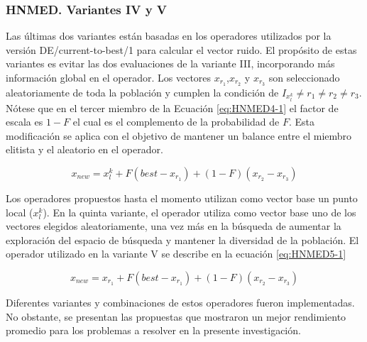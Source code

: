 \subsubsection{HNMED. Variantes IV y V }
Las últimas dos variantes están basadas en los operadores utilizados por la versión DE/current-to-best/1 para calcular el vector ruido. El propósito de estas variantes es evitar las dos evaluaciones de la variante III, incorporando más información global en el operador. Los vectores $x_{r_1}$,$x_{r_2}$ y $x_{r_3}$ son seleccionado aleatoriamente de toda la población y cumplen la condición de $ I_{x^k_l} \neq r_1 \neq r_2 \neq r_3$. Nótese que en el tercer miembro de la Ecuación \ref{eq:HNMED4-1} el factor de escala es $1-F$ el cual es el complemento de la probabilidad de $F$. Esta modificación se aplica con el objetivo de mantener un balance entre el miembro elitista y el aleatorio en el operador.
\begin{center}
\begin{equation}\label{eq:HNMED4-1}
x_{new}= x^k_l+F(best-x_{r_1})+(1-F)(x_{r_2}-x_{r_3})
\end{equation}
\end{center}
Los operadores propuestos hasta el momento utilizan como vector base un punto local ($x^k_l$). En la quinta variante, el operador utiliza como vector base uno de los vectores elegidos aleatoriamente, una vez más en la búsqueda de aumentar la exploración del espacio de búsqueda y mantener la diversidad de la población. El operador utilizado en la variante V se describe en la ecuación \ref{eq:HNMED5-1}
\begin{center}
\begin{equation}\label{eq:HNMED5-1}
x_{new}= x_{r_1}+F(best-x_{r_1})+(1-F)(x_{r_2}-x_{r_3})
\end{equation}
\end{center}
Diferentes variantes y combinaciones de estos operadores fueron implementadas. No obstante, se presentan las propuestas que mostraron un mejor rendimiento promedio para los problemas a resolver en la presente investigación. 
\\
